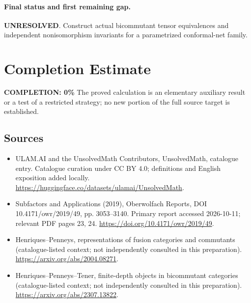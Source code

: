 \documentclass[11pt]{article}
\begin{document}
\paragraph{Final status and first remaining gap.}
\textbf{UNRESOLVED}. Construct actual bicommutant tensor equivalences and independent nonisomorphism invariants for a parametrized conformal-net family.

\section{Completion Estimate}
\noindent\textbf{COMPLETION: 0\%}
The proved calculation is an elementary auxiliary result or a test of a restricted strategy; no new portion of the full source target is established.

\subsection{Sources}
\begin{itemize}
\item[\hypertarget{source:statement:1}{S1}] ULAM.AI and the UnsolvedMath Contributors, UnsolvedMath, catalogue entry. Catalogue curation under CC BY 4.0; definitions and English exposition added locally.
\url{https://huggingface.co/datasets/ulamai/UnsolvedMath}.
\item[\hypertarget{source:statement:2}{S2}] Subfactors and Applications (2019), Oberwolfach Reports, DOI 10.4171/owr/2019/49, pp. 3053--3140. Primary report accessed 2026-10-11; relevant PDF pages 23, 24.
\url{https://doi.org/10.4171/owr/2019/49}.
\item[\hypertarget{source:statement:3}{S3}] Henriques--Penneys, representations of fusion categories and commutants (catalogue-listed context; not independently consulted in this preparation).
\url{https://arxiv.org/abs/2004.08271}.
\item[\hypertarget{source:statement:4}{S4}] Henriques--Penneys--Tener, finite-depth objects in bicommutant categories (catalogue-listed context; not independently consulted in this preparation).
\url{https://arxiv.org/abs/2307.13822}.
\end{itemize}
\label{end:statement}
\end{document}
